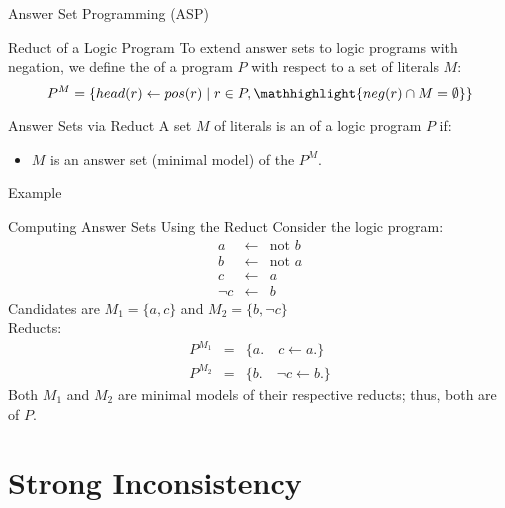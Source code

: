 \begin{frame}{Answer Set Programming (ASP)}
    \begin{block}{Reduct of a Logic Program}
        To extend answer sets to logic programs with negation, we define the  of a program $P$ with respect to a set of literals $M$:
        \[
            P^M = \{head(r) \leftarrow pos(r) \mid r \in P, \mathhighlight{neg(r) \cap M = \emptyset}\}
        \]
    \end{block}
    \begin{block}{Answer Sets via Reduct}
        A set $M$ of literals is an  of a logic program $P$ if:
        \begin{itemize}
            \item $M$ is an answer set (minimal model) of the  $P^M$.
        \end{itemize}
    \end{block}
\end{frame}

\begin{frame}{Example}
    \begin{exampleblock}{Computing Answer Sets Using the Reduct}
        Consider the logic program:
        \[
            \begin{array}{lcl}
                a      & \leftarrow & \text{not } b \\
                b      & \leftarrow & \text{not } a \\
                c      & \leftarrow & a             \\
                \neg c & \leftarrow & b
            \end{array}
        \]
        Candidates are $M_1 = \{a, c\}$ and $M_2 = \{b, \neg c\}$\\
        Reducts:
        \[
            \begin{array}{lcl}
                P^{M_1} & = & \{a.\quad c \leftarrow a.\}      \\
                P^{M_2} & = & \{b.\quad \neg c \leftarrow b.\}
            \end{array}
        \]
        Both $M_1$ and $M_2$ are minimal models of their respective reducts; thus, both are  of $P$.
    \end{exampleblock}
\end{frame}

\section{Strong Inconsistency}

